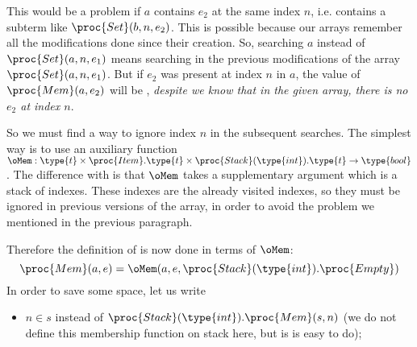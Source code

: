 \begin{itemize}
    This would be a problem if \(a\) contains \(e_2\) at the same
    index \(n\), i.e. contains a subterm like \(\proc{Set} 
    (b, n, e_2)\). This is possible because our arrays remember all
    the modifications done since their creation. So, searching \(a\)
    instead of \(\proc{Set} (a, n, e_1)\) means searching in the
    previous modifications of the array \(\proc{Set} (a, n,
    e_1)\). But if \(e_2\) was present at index \(n\) in \(a\), the
    value of \(\proc{Mem} (a, e_2)\) will be ,
    \emph{despite we know that in the given array, there is no
      \(e_2\) at index \(n\)}. 

    So we must find a way to ignore index \(n\) in the subsequent
    searches. The simplest way is to use an auxiliary function
    \(\oMem: \type{t} \times \proc{Item}.\type{t} \times
    \proc{Stack}(\type{int}).\type{t} \rightarrow \type{bool}\). The
    difference with  is that \(\oMem\) takes a supplementary
    argument which is a stack of indexes. These indexes are the
    already visited indexes, so they must be ignored in previous
    versions of the array, in order to avoid the problem we mentioned
    in the previous paragraph. 

    Therefore the definition of  is now done in terms of
    \(\oMem\):
    \[
      \proc{Mem} (a, e) = \oMem (a, e, \proc{Stack}(\type{int}).\proc{Empty})
    \]
    In order to save some space, let us write
    \begin{itemize}
      \item \(n \in s\) instead of
      \(\proc{Stack}(\type{int}).\proc{Mem} (s, n)\) (we do not define
      this membership function on stack here, but is is easy to do);


\end{itemize}
\end{itemize}
